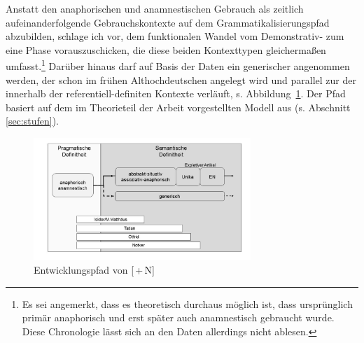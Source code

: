 Anstatt den anaphorischen  und anamnestischen  Gebrauch als zeitlich aufeinanderfolgende Gebrauchskontexte auf dem Grammatikalisierungspfad  abzubilden, schlage ich vor, dem funktionalen Wandel vom Demonstrativ-  zum  eine Phase vorauszuschicken, die diese beiden Kontexttypen gleichermaßen umfasst.\footnote{Es sei angemerkt, dass es theoretisch durchaus möglich ist, dass  ursprünglich primär anaphorisch  und erst später auch anamnestisch  gebraucht wurde. Diese Chronologie lässt sich an den Daten allerdings nicht ablesen.} Darüber hinaus darf auf Basis der Daten ein generischer   angenommen werden, der schon im frühen Althochdeutschen angelegt wird und parallel zur  der  innerhalb der referentiell-definiten Kontexte verläuft, s. Abbildung~\ref{abb:expansion-definitheit}. Der Pfad basiert auf dem im Theorieteil der Arbeit vorgestellten Modell aus \textcite{Schmuck2014} (s. Abschnitt \ref{sec:stufen}). 

 
\begin{figure}
  \includegraphics[width=82mm]{images/diskussion_generisch.jpg}
\caption {Entwicklungspfad von [\,+\,N]\label{abb:expansion-definitheit}} 
\end{figure} 
 
